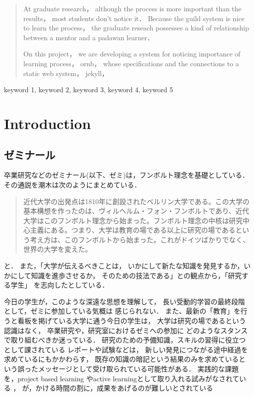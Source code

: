 \documentclass{hissymp}
\author{bob}
\date{}
\begin{document}
\begin{abstract}
\label{sec:org8de703f}
At graduate research，
although the process is more important than the results，
most students don't notice it．
Because the guild system is nice to learn the process，
the graduate reseach possesses a kind of
relationship between
a mentor and a padawan learner．

On this project，
we are developing a system for
noticing importance of learning process，
ornb， whose specifications and
the connections to a static web system， jekyll，


\end{abstract}

\begin{keyword}
keyword 1, keyword 2, keyword 3, keyword 4, keyword 5
\end{keyword}

\maketitle
\section{Introduction}

\label{sec:orgb0ecc34}
\subsection{ゼミナール}
\label{sec:org4b4cad9}
卒業研究などのゼミナール(以下、ゼミ)は，フンボルト理念を基礎としている．その通説を潮木は次のようにまとめている．
\begin{quote}
近代大学の出発点は1810年に創設されたベルリン大学である。この大学の基本構想を作ったのは、ヴィルヘルム・フォン・フンボルトであり、近代大学はこのフンボルト理念から始まった。フンボルト理念の中核は研究中心主義にある。つまり、大学は教育の場である以上に研究の場であるという考え方は、このフンボルトから始まった。これがドイツばかりでなく、世界の大学を変えた。
\cite{Ushiogi_column}
\end{quote}
と． また，「大学が伝えるべきことは，
いかにして新たな知識を発見するか，いかにして知識を進歩させるか，
そのための技法である」との観点から，「研究する学生」
を志向したとしている．

今日の学生が，このような深遠な思想を理解して，
長い受動的学習の最終段階として，ゼミに参加している気概は
感じられない．
また、最新の「教育」を行うと看板を掲げている大学に通う今日の学生は，
大学は研究の場であるという認識はなく，
卒業研究や，研究室におけるゼミへの参加に
どのようなスタンスで取り組むべきか迷っている．
研究のための予備知識，スキルの習得に役立つとして課されている
レポートや試験などは，
新しい発見につながる途中経過を求めているにもかかわらす，
既存の知識の暗記という結果のみを求めているという誤ったメッセージとして受け取られている可能性がある．
実践的な課題を，project based learning \cite{Bell}
やactive learningとして取り入れる試みがなされている
\cite{Settles}，\cite{溝上}
が，かける時間の割に，成果をあげるのが難しいとされている
\end{document}
